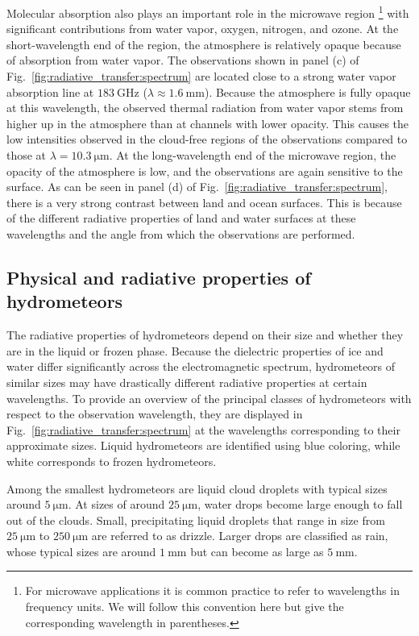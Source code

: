 Molecular absorption also plays an important role in the microwave region%
\footnote{For microwave applications it is common
practice to refer to wavelengths in frequency units. We will follow this
convention here but give the corresponding wavelength in parentheses.}
with significant contributions from water vapor, oxygen, nitrogen, and ozone. At
the short-wavelength end of the region, the atmosphere is relatively opaque
because of absorption from water vapor. The observations shown in panel (c) of
Fig.~\ref{fig:radiative_transfer:spectrum} are located close to a strong water
vapor absorption line at $\SI{183}{\giga \hertz}$
($\lambda \approx \SI{1.6}{\milli \meter}$). Because the atmosphere is fully
opaque at this wavelength, the observed thermal radiation from water vapor stems from
higher up in the atmosphere than at channels with lower opacity. This causes the
low intensities observed in the cloud-free regions of the observations compared
to those at $\lambda = \SI{10.3}{\micro \meter}$. At the
long-wavelength end of the microwave region, the opacity of the atmosphere is
low, and the observations are again sensitive to the surface. As can be seen in panel
(d) of Fig.~\ref{fig:radiative_transfer:spectrum}, there is a very strong contrast
between land and ocean surfaces. This is because of the different radiative
properties of land and water surfaces at these wavelengths and the angle
from which the observations are performed.

\subsection{Physical and radiative properties of hydrometeors}

The radiative properties of hydrometeors depend on their size and whether they
are in the liquid or frozen phase. Because the dielectric properties of ice and
water differ significantly across the electromagnetic spectrum, hydrometeors of
similar sizes may have drastically different radiative properties at certain
wavelengths. To provide an overview of the principal classes of hydrometeors
with respect to the observation wavelength, they are displayed in
Fig.~\ref{fig:radiative_transfer:spectrum} at the wavelengths corresponding to
their approximate sizes. Liquid hydrometeors are identified using blue coloring,
while white corresponds to frozen hydrometeors.

Among the smallest hydrometeors are liquid cloud droplets with typical sizes
around $\SI{5}{\micro \meter}$. At sizes of around $\SI{25}{\micro \meter}$,
water drops become large enough to fall out of the clouds. Small, precipitating
liquid droplets that range in size from $\SI{25}{\micro \meter}$ to
$\SI{250}{\micro \meter}$ are referred to as drizzle. Larger drops are
classified as rain, whose typical sizes are around $\SI{1}{\milli \meter}$ but can
become as large as $\SI{5}{\milli \meter}$.

